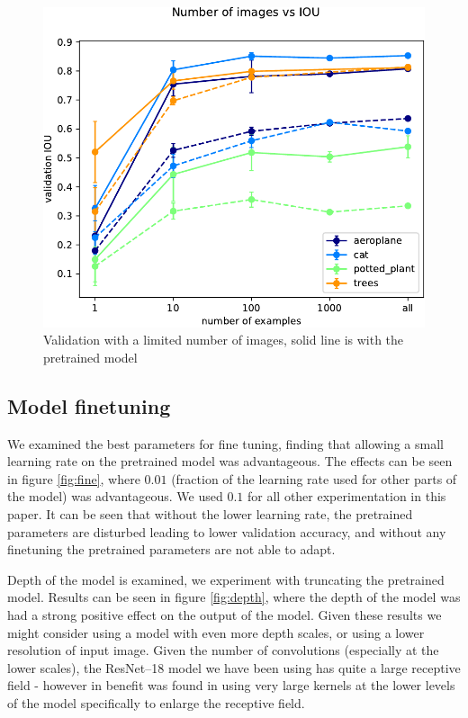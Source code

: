 \documentclass{article}
\begin{document}
\begin{figure}[t]
\centering
\includegraphics[width=0.9\linewidth]{images/limit.pdf}
\caption{Validation with a limited number of images, solid line is with the pretrained model}  
\label{fig:limited}
\end{figure}



\subsection{Model finetuning}

We examined the best parameters for fine tuning, finding that allowing a small learning rate on the pretrained model was advantageous. The effects can be seen in figure \ref{fig:fine}, where $0.01$ (fraction of the learning rate used for other parts of the model) was advantageous. We used $ 0.1 $ for all other experimentation in this paper. It can be seen that without the lower learning rate, the pretrained parameters are disturbed leading to lower validation accuracy, and without any finetuning the pretrained parameters are not able to adapt.

Depth of the model is examined, we experiment with truncating the pretrained model. Results can be seen in figure \ref{fig:depth}, where the depth of the model was had a strong positive effect on the output of the model. Given these results we might consider using a model with even more depth scales, or using a lower resolution of input image. Given the number of convolutions (especially at the lower scales), the ResNet--18 model we have been using has quite a large receptive field - however in \cite{Peng2017} benefit was found in using very large kernels at the lower levels of the model specifically to enlarge the receptive field.
\end{document}
